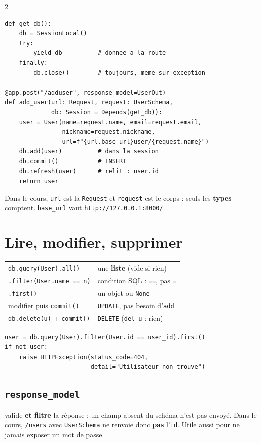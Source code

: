 \documentclass[a4paper,10pt]{article}
\newcommand{\co}[1]{\texttt{\textcolor{codefg}{#1}}}
\begin{document}
\begin{multicols}{2}
\begin{lstlisting}
def get_db():
    db = SessionLocal()
    try:
        yield db          # donnee a la route
    finally:
        db.close()        # toujours, meme sur exception

@app.post("/adduser", response_model=UserOut)
def add_user(url: Request, request: UserSchema,
             db: Session = Depends(get_db)):
    user = User(name=request.name, email=request.email,
                nickname=request.nickname,
                url=f"{url.base_url}user/{request.name}")
    db.add(user)          # dans la session
    db.commit()           # INSERT
    db.refresh(user)      # relit : user.id
    return user
\end{lstlisting}

Dans le cours, \co{url} est la \co{Request} et \co{request} est le corps :
seuls les \textbf{types} comptent. \co{base\_url} vaut
\co{http://127.0.0.1:8000/}.

\section{Lire, modifier, supprimer}

\begin{tabularx}{\linewidth}{@{}l>{\raggedright\arraybackslash}X@{}}
\toprule
\co{db.query(User).all()} & une \textbf{liste} (vide si rien) \\
\co{.filter(User.name == n)} & condition SQL : \co{==}, pas \co{=} \\
\co{.first()} & un objet ou \co{None} \\
modifier puis \co{commit()} & \co{UPDATE}, pas besoin d'\co{add} \\
\co{db.delete(u)} + \co{commit()} & \co{DELETE} (\co{del u} : rien) \\
\bottomrule
\end{tabularx}

\begin{lstlisting}
user = db.query(User).filter(User.id == user_id).first()
if not user:
    raise HTTPException(status_code=404,
                        detail="Utilisateur non trouve")
\end{lstlisting}

\subsection{\co{response\_model}} valide \textbf{et filtre} la réponse : un
champ absent du schéma n'est pas envoyé. Dans le cours, \co{/users} avec
\co{UserSchema} ne renvoie donc \textbf{pas} l'\co{id}. Utile aussi pour ne
jamais exposer un mot de passe.


\end{multicols}
\end{document}
